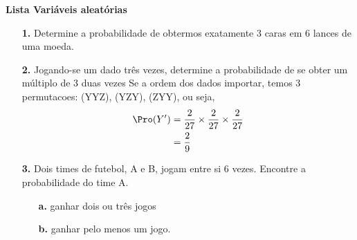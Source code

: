 \begin{center}
\textbf{\LARGE{Lista Variáveis aleatórias}}
\end{center}
\begin{itemize}
	\item[\textbf{1.}] Determine a probabilidade de obtermos exatamente 3 caras em 6 lances de uma moeda.
	\item[\textbf{2.}] Jogando-se um dado três vezes, determine a probabilidade de se obter um múltiplo de 3 duas vezes
	\ifx Se a ordem dos dados importar, temos 3 permutacoes: (YYZ), (YZY), (ZYY), ou seja,\\
	\begin{align*}
	    \Pro(Y') &= \frac{2}{27}\times\frac{2}{27}\times\frac{2}{27}\\
	    &= \frac{2}{9}
	\end{align*}
	\fi
	\item[\textbf{3.}] Dois times de futebol, A e B, jogam entre si 6 vezes. Encontre a probabilidade do time A.
	\begin{itemize}
	    \item[\textbf{a.}] ganhar dois ou três jogos
	    \item[\textbf{b.}] ganhar pelo menos um jogo.

\end{itemize}
\end{itemize}
